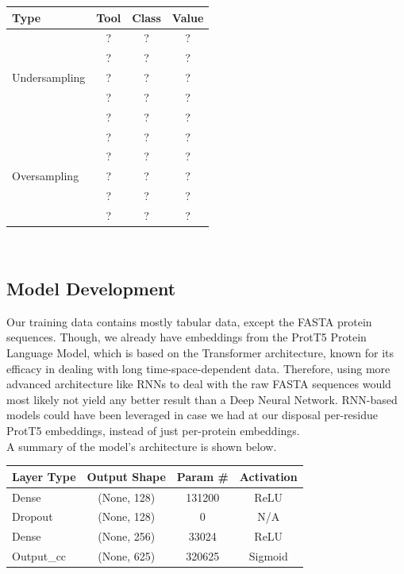 \documentclass[10pt,twocolumn,letterpaper]{article}
\begin{document}
\begin{center}
    \begin{tabular}{lccc}
        \toprule
        Type & Tool & Class & Value\\
        \midrule
                      & ? & ? & ?\\
                      & ? & ? & ?\\
        Undersampling & ? & ? & ?\\
                      & ? & ? & ?\\
                      & ? & ? & ?\\
                      & ? & ? & ?\\
        \midrule
                      & ? & ? & ?\\
        Oversampling  & ? & ? & ?\\
                      & ? & ? & ?\\
                      & ? & ? & ?\\
        \bottomrule
    \end{tabular} \\
    \end{center}
    

\subsection{Model Development}

Our training data contains mostly tabular data, except the FASTA protein sequences. Though, we already have embeddings from the ProtT5 Protein Language Model, which is based on the Transformer architecture, known for its efficacy in dealing with long time-space-dependent data. Therefore, using more advanced architecture like RNNs to deal with the raw FASTA sequences would most likely not yield any better result than a Deep Neural Network. RNN-based models could have been leveraged in case we had at our disposal per-residue ProtT5 embeddings, instead of just per-protein embeddings. \\



A summary of the model's architecture is shown below.

\begin{center}
\begin{tabular}{lccc}
    \toprule
    Layer Type & Output Shape & Param \# & Activation\\
    \midrule
    Dense & (None, 128) & 131200 & ReLU\\
    Dropout & (None, 128) & 0 & N/A\\
    Dense &  (None, 256) & 33024 & ReLU \\
    Output\_cc & (None, 625) & 320625 & Sigmoid \\
    \bottomrule
\end{tabular} \\
\end{center}
\end{document}
